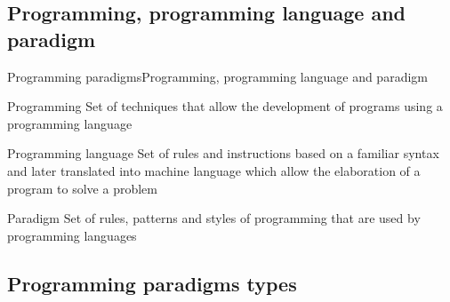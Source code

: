 \documentclass[10pt,compress]{beamer} %
\begin{document}



\subsection{Programming, programming language and paradigm}

\begin{frame}{Programming paradigms}{Programming, programming language and paradigm}
	\begin{block}{Programming}
		Set of techniques that allow the development of programs using a programming language
	\end{block}
	\begin{block}{Programming language}
		Set of rules and instructions based on a familiar syntax and later translated into machine language which allow the elaboration of a program to solve a problem	\end{block}
	\begin{block}{Paradigm}
		Set of rules, patterns and styles of programming that are used by programming languages
	\end{block}

\end{frame}

\subsection[Programming paradigms types]{Programming paradigms types}
\end{document}
